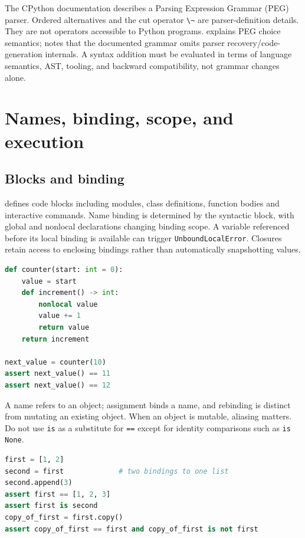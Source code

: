 \documentclass[
  11pt,
]{report}
\newcommand{\passthrough}[1]{#1}
\begin{document}
The CPython documentation describes a Parsing Expression Grammar (PEG)
parser. Ordered alternatives and the cut operator
\passthrough{\lstinline!\~!} are parser-definition details. They are not
operators accessible to Python programs.
 explains PEG choice
semantics;  notes
that the documented grammar omits parser recovery/code-generation
internals. A syntax addition must be evaluated in terms of language
semantics, AST, tooling, and backward compatibility, not grammar changes
alone.

\chapter{Names, binding, scope, and
execution}\label{names-binding-scope-and-execution}

\section{Blocks and binding}\label{blocks-and-binding}

 defines code
blocks including modules, class definitions, function bodies and
interactive commands. Name binding is determined by the syntactic block,
with global and nonlocal declarations changing binding scope. A variable
referenced before its local binding is available can trigger
\passthrough{\lstinline!UnboundLocalError!}. Closures retain access to
enclosing bindings rather than automatically snapshotting values.

\begin{lstlisting}[language=Python]
def counter(start: int = 0):
    value = start
    def increment() -> int:
        nonlocal value
        value += 1
        return value
    return increment

next_value = counter(10)
assert next_value() == 11
assert next_value() == 12
\end{lstlisting}

A name refers to an object; assignment binds a name, and rebinding is
distinct from mutating an existing object. When an object is mutable,
aliasing matters. Do not use \passthrough{\lstinline!is!} as a
substitute for \passthrough{\lstinline!==!} except for identity
comparisons such as \passthrough{\lstinline!is None!}.

\begin{lstlisting}[language=Python]
first = [1, 2]
second = first             # two bindings to one list
second.append(3)
assert first == [1, 2, 3]
assert first is second
copy_of_first = first.copy()
assert copy_of_first == first and copy_of_first is not first
\end{lstlisting}
\end{document}
